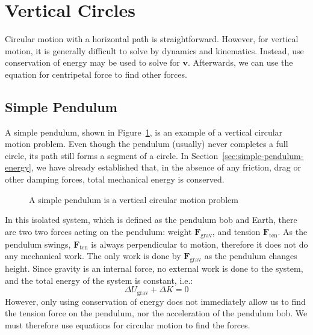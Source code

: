 \section{Vertical Circles}

Circular motion with a horizontal path is straightforward. However, for
vertical motion, it is generally difficult to solve by dynamics and kinematics.
Instead, use conservation of energy may be used to solve for $\bm v$.
Afterwards, we can use the equation for centripetal force to find other forces.




\subsection{Simple Pendulum}
A simple pendulum, shown in Figure~\ref{fig:simple-pendulum-again}, is an
example of a vertical circular motion problem. Even though the pendulum
(usually) never completes a full circle, its path still forms a segment of a
circle. In Section~\ref{sec:simple-pendulum-energy}, we have already
established that, in the absence of any friction, drag or other damping forces,
total mechanical energy is conserved.
\begin{figure}[ht]
  \centering
  \caption{A simple pendulum is a vertical circular motion problem}
  \label{fig:simple-pendulum-again}
\end{figure}
In this isolated system, which is defined as the pendulum bob and Earth, there
are two two forces acting on the pendulum: weight $\bm F_\text{grav}$, and
tension $\bm F_\text{ten}$. As the pendulum swings, $\bm F_\text{ten}$ is always
perpendicular to motion, therefore it does not do any mechanical work. The only
work is done by $\bm F_\text{grav}$ as the pendulum changes height. Since
gravity is an internal force, no external work is done to the system, and the
total energy of the system is constant, i.e.:
\begin{equation*}
  \Delta U_\text{grav} + \Delta K = 0
\end{equation*}
However, only using conservation of energy does not immediately allow us to
find the tension force on the pendulum, nor the acceleration of the pendulum
bob. We must therefore use equations for circular motion to find the forces.

